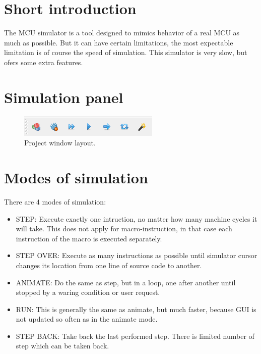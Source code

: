 \section{Short introduction}
    The MCU simulator is a tool designed to mimics behavior of a real MCU as much as possible. But it can have certain limitations, the most expectable limitation is of course the speed of simulation. This simulator is very slow, but ofers some extra features.


\section{Simulation panel}

    \begin{figure}[h!]
        \centering{}
        \includegraphics[width=.9\textwidth]{img/simulation_panel.png}
        \caption{Project window layout.}
    \end{figure}
    
\section{Modes of simulation}
    There are 4 modes of simulation:
    \begin{itemize}
        \item STEP: Execute exactly one intruction, no matter how many machine cycles it will take. This does not apply for macro-instruction, in that case each instruction of the macro is executed separately.
        \item STEP OVER: Execute as many instructions as possible until simulator cursor changes its location from one line of source code to another.
        \item ANIMATE: Do the same as step, but in a loop, one after another until stopped by a waring condition or user request.
        \item RUN: This is generally the same as animate, but much faster, because GUI is not updated so often as in the animate mode.
        \item STEP BACK: Take back the last performed step. There is limited number of step which can be taken back.
    \end{itemize}
